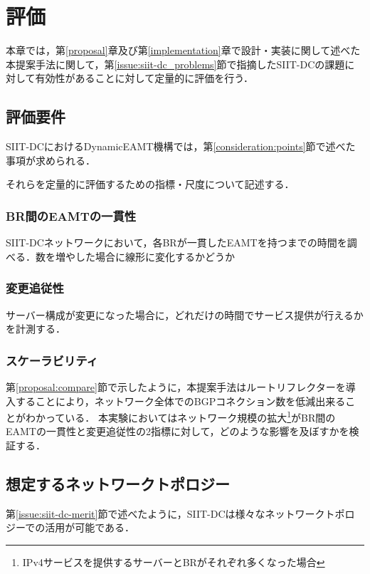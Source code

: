 \chapter{評価}
\label{evaluation}
本章では，第\ref{proposal}章及び第\ref{implementation}章で設計・実装に関して述べた本提案手法に関して，第\ref{issue:siit-dc_problems}節で指摘したSIIT-DCの課題に対して有効性があることに対して定量的に評価を行う．



\section{評価要件}
SIIT-DCにおけるDynamicEAMT機構では，第\ref{consideration:points}節で述べた事項が求められる．

それらを定量的に評価するための指標・尺度について記述する．


\subsection{BR間のEAMTの一貫性}
SIIT-DCネットワークにおいて，各BRが一貫したEAMTを持つまでの時間を調べる．数を増やした場合に線形に変化するかどうか

\subsection{変更追従性}
サーバー構成が変更になった場合に，どれだけの時間でサービス提供が行えるかを計測する．

\subsection{スケーラビリティ}
第\ref{proposal:compare}節で示したように，本提案手法はルートリフレクターを導入することにより，ネットワーク全体でのBGPコネクション数を低減出来ることがわかっている．
本実験においてはネットワーク規模の拡大\footnote{IPv4サービスを提供するサーバーとBRがそれぞれ多くなった場合}がBR間のEAMTの一貫性と変更追従性の2指標に対して，どのような影響を及ぼすかを検証する．



\section{想定するネットワークトポロジー}
第\ref{issue:siit-dc-merit}節で述べたように，SIIT-DCは様々なネットワークトポロジーでの活用が可能である．




